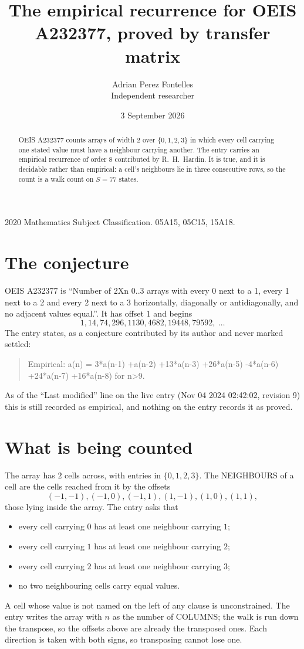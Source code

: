 \documentclass[11pt,a4paper]{article}
\title{The empirical recurrence for OEIS A232377, proved by transfer matrix}
\author{Adrian Perez Fontelles\\ \small Independent researcher}
\date{3 September 2026}
\theoremstyle{plain}
\theoremstyle{definition}
\begin{document}
\maketitle

\begin{abstract}
OEIS A232377 counts arrays of width $2$ over $\{0,1,2,3\}$ in which every cell carrying one stated
value must have a neighbour carrying another. The entry carries an empirical recurrence of
order $8$ contributed by R.~H.~Hardin. It is true, and it is decidable rather than
empirical: a cell's neighbours lie in three consecutive rows, so the count is a walk count on
$S=77$ states.
\end{abstract}

\noindent\small 2020 Mathematics Subject Classification. 05A15, 05C15, 15A18.\normalsize

\section{The conjecture}

OEIS A232377 is ``Number of 2Xn 0..3 arrays with every 0 next to a 1, every 1 next to a 2 and every 2 next to a 3 horizontally, diagonally or antidiagonally, and no adjacent values equal.''. It has offset $1$ and begins
\[
1, 14, 74, 296, 1130, 4682, 19448, 79592,\ \dots
\]
The entry states, as a conjecture contributed by its author and never marked settled:
\begin{quote}
Empirical: a(n) = 3*a(n-1) +a(n-2) +13*a(n-3) +26*a(n-5) -4*a(n-6) +24*a(n-7) +16*a(n-8) for n>9.
\end{quote}
As of the ``Last modified'' line on the live entry (Nov 04 2024 02:42:02, revision 9) this is still
recorded as empirical, and nothing on the entry records it as proved.

\section{What is being counted}

The array has $2$ cells across, with entries in $\{0,1,2,3\}$. The NEIGHBOURS of a cell are the
cells reached from it by the offsets
\[
(-1,-1), (-1,0), (-1,1), (1,-1), (1,0), (1,1),
\]
those lying inside the array. The entry asks that
\begin{itemize}
\item every cell carrying $0$ has at least one neighbour carrying $1$;
\item every cell carrying $1$ has at least one neighbour carrying $2$;
\item every cell carrying $2$ has at least one neighbour carrying $3$;
\item no two neighbouring cells carry equal values.
\end{itemize}
A cell whose value is not named on the left of any clause is unconstrained. The entry writes the array with $n$ as the number of COLUMNS; the walk is run down the transpose, so the offsets above are already the transposed ones. Each direction is taken with both signs, so transposing cannot lose one.
\end{document}

